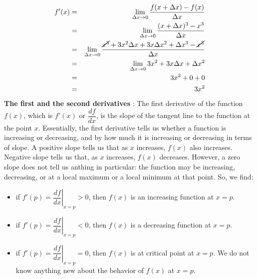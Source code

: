 \documentclass[conference,final,11pt,technote,onecolumn]{IEEEtran}\usepackage[]{graphicx}\usepackage[]{color}
\begin{document}
\begin{eqnarray}
	\nonumber f'(x) &=& \lim_{\Delta x\rightarrow 0}\dfrac{f(x+\Delta x) - f(x)}{\Delta x}\\
	\nonumber &=& \lim_{\Delta x\rightarrow 0}\dfrac{(x+\Delta x)^3 - x^3}{\Delta x}\\
	\nonumber &=& \lim_{\Delta x\rightarrow 0}\dfrac{\cancel{x^3}+3x^2\Delta x+3x\Delta x^2+\Delta x^3 - \cancel{x^3}}{\Delta x}\\
	\nonumber &=& \lim_{\Delta x\rightarrow 0}3x^2+3x\Delta x+\Delta x^2\\
	\nonumber &=& 3x^2 + 0 + 0\\
	\nonumber &=& 3x^2
\end{eqnarray}
\textbf{The first and the second derivatives }\cite{opencalc2}: The first derivative of the function $f(x)$, which is $f'(x)$ or $\dfrac{df}{dx}$, is the slope of the tangent line to the function at the point $x$. Essentially, the first derivative tells us whether a function is increasing or decreasing, and by how much it is increasing or decreasing in terms of slope. A positive slope tells us that as $x$ increases, $f(x)$ also increases. Negative slope tells us that, as $x$ increases, $f(x)$ decreases. However, a zero slope does not tell us anthing in particular: the function may be increasing, decreasing, or at a local maximum or a local minimum at that point. So, we find:
\begin{itemize}
	\item if $f'(p) = \left.\dfrac{df}{dx}\right|_{x=p} > 0$, then $f(x)$ is an increasing function at $x=p$.
	\item if $f'(p) = \left.\dfrac{df}{dx}\right|_{x=p} < 0$, then $f(x)$ is a decreasing function at $x=p$.
	\item if $f'(p) = \left.\dfrac{df}{dx}\right|_{x=p} = 0$, then $f(x)$ is at critical point at $x=p$. We do not know anything new about the behavior of $f(x)$ at $x=p$.
\end{itemize}
\end{document}
